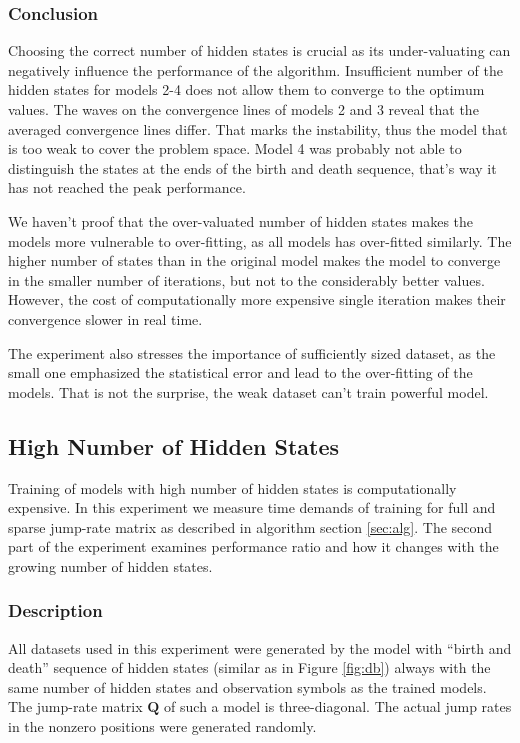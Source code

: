 \documentclass[thesis=M,english]{FITthesis}[2012/10/20]
\newcommand{\matr}[1]{\mathbf{#1}}
\begin{document}
\subsubsection*{ Conclusion }
Choosing the correct number of hidden states is crucial as its under-valuating can negatively influence the performance of the algorithm. Insufficient number of the hidden states for models 2-4 does not allow them to converge to the optimum values. The waves on the convergence lines of models 2 and 3 reveal that the averaged convergence lines differ. That marks the instability, thus the model that is too weak to cover the problem space. Model 4 was probably not able to distinguish the states at the ends of the birth and death sequence, that's way it has not reached the peak performance.

We haven't proof that the over-valuated number of hidden states makes the models more vulnerable to over-fitting, as all models has over-fitted similarly. The higher number of states than in the original model makes the model to converge in the smaller number of iterations, but not to the considerably better values. However, the cost of computationally more expensive single iteration makes their convergence slower in real time.

The experiment also stresses the importance of sufficiently sized dataset, as the small one emphasized the statistical error and lead to the over-fitting of the models. That is not the surprise, the weak dataset can't train powerful model. 

\subsection{High Number of Hidden States}\label{sec:high}

Training of models with high number of hidden states is computationally expensive. In this experiment we measure time demands of training for full and sparse jump-rate matrix as described in algorithm section \ref{sec:alg}. The second part of the experiment examines performance ratio and how it changes with the growing number of hidden states. 

\subsubsection*{ Description }

All datasets used in this experiment were generated by the model with ``birth and death'' sequence of hidden states (similar as in Figure \ref{fig:db}) always with the same number of hidden states and observation symbols as the trained models. The jump-rate matrix $\matr{Q}$ of such a model is three-diagonal. The actual jump rates in the nonzero positions were generated randomly.
\end{document}
